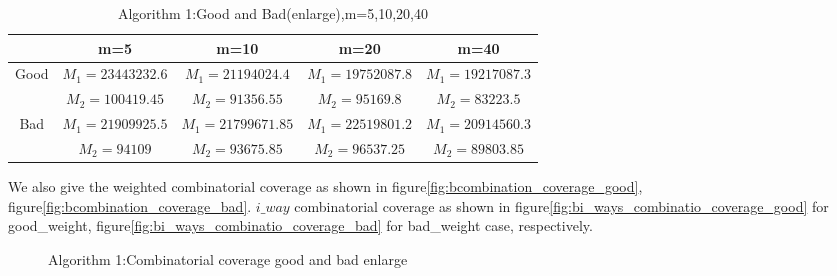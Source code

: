 \documentclass[10pt,conference, compsocconf]{IEEEtran}
\begin{document}
\begin{CJK}{UTF8}{gkai}
\begin{table}
    \renewcommand{\arraystretch}{1.2}
    \caption{Algorithm 1:Good and Bad(enlarge),m=5,10,20,40}
    \label{table:good_and_bada}
    \centering
    \begin{tabular}{c c c c c}
    \hline
                                &          m=5            &         m=10           &       m=20            &    m=40   \\ \hline
    \multirow{2}{*}{Good} &  $M_1=23443232.6$    & $M_1=21194024.4$     & $M_1=19752087.8$   & $M_1=19217087.3$ \\
                          &  $M_2=100419.45$     & $M_2=91356.55$       & $M_2=95169.8$      & $M_2=83223.5   $     \\ \hline
    \multirow{2}{*}{Bad}  &  $M_1=21909925.5$    & $M_1=21799671.85$    & $M_1=22519801.2$   & $M_1=20914560.3$ \\
                          &  $M_2=94109$         & $M_2=93675.85$       & $M_2=96537.25$     & $M_2=89803.85 $ \\ \hline 
    \end{tabular}
\end{table}

We also give the weighted combinatorial coverage as shown in
figure\ref{fig:bcombination_coverage_good},
figure\ref{fig:bcombination_coverage_bad}. 
$i\_{way}$ combinatorial coverage as shown in
figure\ref{fig:bi_ways_combinatio_coverage_good} for good\_weight,
figure\ref{fig:bi_ways_combinatio_coverage_bad} for bad\_weight case,
respectively.

 \begin{figure}
   \centering
\caption{Algorithm 1:Combinatorial coverage good and bad enlarge}
\end{figure}


\end{CJK}
\end{document}
